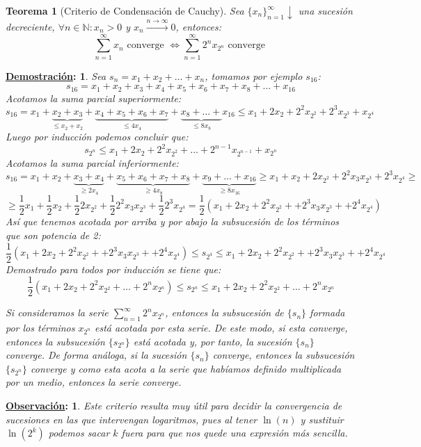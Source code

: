 \documentclass[10pt,a4paper,openright]{book}
\theoremstyle{break}
\newtheorem*{theo}{Teorema}
\newtheorem*{demo}{\underline{Demostración}:}
\newtheorem*{obs}{\underline{Observación}:}
\begin{document}
\begin{theo}[Criterio de Condensación de Cauchy]
Sea $\{x_n\}_{n=1}^\infty \downarrow$ una sucesión decreciente, $\forall n \in  \mathbb{N} : x_n > 0$ y $x_n \xrightarrow{n\rightarrow \infty} 0$, entonces:
$$\sum_{n=1}^{\infty} x_n \mbox{ converge } \Leftrightarrow \sum_{n=1}^{\infty} 2^n x_{2^n} \mbox{ converge }$$
\end{theo}
\begin{demo}
Sea $s_n = x_1 + x_2 + \ldots + x_n$, tomamos por ejemplo $s_{16}$:
$$s_{16} = x_1 + x_2 + x_3 + x_4 + x_5 + x_6 + x_7 + x_8 + \ldots + x_{16}$$
Acotamos la suma parcial superiormente:
$$s_{16} = x_1 + \underbrace{x_2 + x_3}_{ \leq x_2 + x_2} + \underbrace{x_4 + x_5 + x_6 + x_7}_{\leq 4x_4} + \underbrace{x_8 + \ldots +}_{\leq 8x_8} x_{16} \leq x_1 + 2x_2 + 2^2 x_{2^2} + 2^3 x_{2^3} + x_{2^4}$$
Luego por inducción podemos concluir que:
$$s_{2^n} \leq x_1 + 2x_2 + 2^2 x_{2^2} + \ldots + 2^{n-1} x_{2^{n-1}}+ x_{2^n}$$
Acotamos la suma parcial inferiormente:
$$s_{16} = x_1 + x_2 +\underbrace{ x_3 + x_4}_{\geq 2x_4} + \underbrace{ x_5 + x_6 + x_7 + x_8}_{\geq 4x_8} + \underbrace{ x_9 + \ldots + x_{16}}_{\geq 8x_{16}}\geq x_1 + x_2 + 2 x_{2^2} + 2^2 x_3 x_{2^3} +  2^3 x_{2^4} \geq$$
$$\geq \frac{1}{2}  x_1 + \frac{1}{2} x_2 + \frac{1}{2} 2 x_{2^2} + \frac{1}{2} 2^2 x_3 x_{2^3} + \frac{1}{2} 2^3 x_{2^4} =\frac{1}{2} (x_1 + 2x_2 + 2^2 x_{2^2} + + 2^3 x_3 x_{2^3} + + 2^4 x_{2^4})$$
Así que tenemos acotada por arriba y por abajo la subsucesión de los términos que son potencia de 2:
$$\frac{1}{2} (x_1 + 2x_2 + 2^2 x_{2^2} + + 2^3 x_3 x_{2^3} + + 2^4 x_{2^4}) \leq s_{2^4} \leq x_1 + 2x_2 + 2^2 x_{2^2} + + 2^3 x_3 x_{2^3} + + 2^4 x_{2^4}$$
Demostrado para todos por inducción se tiene que:
$$\frac{1}{2} (x_1 + 2x_2 + 2^2 x_{2^2} + \ldots + 2^n x_{2^n}) \leq s_{2^n} \leq x_1 + 2x_2 + 2^2 x_{2^2} + \ldots + 2^n x_{2^n}$$

Si consideramos la serie $ \sum_{n=1}^{\infty} 2^n x_{2^n} $, entonces la subsucesión de $\{s_n\}$ formada por los términos $x_{2^n}$ está acotada por 
esta serie. De este modo, si esta converge, entonces la subsucesión $\{s_{2^n}\}$ está acotada y, por tanto, la sucesión $\{s_n\}$ converge. De forma análoga, si la sucesión $\{s_n\}$ converge, entonces la subsucesión $\{s_{2^n}\}$ converge y como esta acota a la serie que habíamos definido multiplicada por un medio, entonces la serie converge.
\end{demo}

\begin{obs}
Este criterio resulta muy útil para decidir la convergencia de sucesiones en las que intervengan logaritmos, pues al tener $\ln (n)$ y sustituir $\ln (2^k)$ podemos sacar $k$ fuera para que nos quede una expresión más sencilla.
\end{obs}
\end{document}
